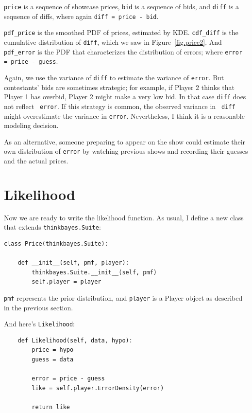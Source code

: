 \documentclass[12pt]{book}
\begin{document}
{\tt price} is a sequence of showcase prices, {\tt bid} is a
sequence of bids, and {\tt diff} is a sequence of diffs, where
again {\tt diff = price - bid}.

\verb"pdf_price" is the smoothed PDF of prices, estimated by KDE.
\verb"cdf_diff" is the cumulative distribution of {\tt diff},
which we saw in Figure~\ref{fig.price2}.  And \verb"pdf_error"
is the PDF that characterizes the distribution of errors; where
{\tt error = price - guess}.

Again, we use the variance of {\tt diff} to estimate the variance of
{\tt error}.  But contestants' bids are sometimes strategic; for
example, if Player 2 thinks that Player 1 has overbid, Player 2 might
make a very low bid.  In that case {\tt diff} does not reflect {\tt
  error}.  If this strategy is common, the observed variance in {\tt
  diff} might overestimate the variance in {\tt error}.  Nevertheless,
I think it is a reasonable modeling decision.

As an alternative, someone preparing to appear on the show could
estimate their own distribution of {\tt error} by watching previous shows
and recording their guesses and the actual prices.


\section{Likelihood}

Now we are ready to write the likelihood function.  As usual,
I define a new class that extends {\tt thinkbayes.Suite}:

\begin{verbatim}
class Price(thinkbayes.Suite):

    def __init__(self, pmf, player):
        thinkbayes.Suite.__init__(self, pmf)
        self.player = player
\end{verbatim}

{\tt pmf} represents the prior distribution, and
{\tt player} is a Player object as described in the previous
section.

And here's {\tt Likelihood}:

\begin{verbatim}
    def Likelihood(self, data, hypo):
        price = hypo
        guess = data

        error = price - guess
        like = self.player.ErrorDensity(error)

        return like
\end{verbatim}
\end{document}
